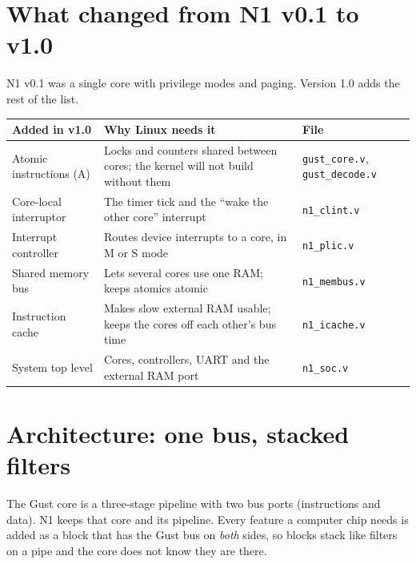 \documentclass[10pt,a4paper]{article}
\newcommand{\code}[1]{\texttt{#1}}
\begin{document}
\section{What changed from N1 v0.1 to v1.0}
N1 v0.1 was a single core with privilege modes and paging. Version 1.0 adds the rest of the list.

\begin{center}\small
\begin{tabularx}{\linewidth}{@{}lXl@{}}
\toprule
Added in v1.0 & Why Linux needs it & File\\
\midrule
Atomic instructions (A) & Locks and counters shared between cores; the kernel will not build without them & \code{gust\_core.v}, \code{gust\_decode.v}\\
Core-local interruptor & The timer tick and the ``wake the other core'' interrupt & \code{n1\_clint.v}\\
Interrupt controller & Routes device interrupts to a core, in M or S mode & \code{n1\_plic.v}\\
Shared memory bus & Lets several cores use one RAM; keeps atomics atomic & \code{n1\_membus.v}\\
Instruction cache & Makes slow external RAM usable; keeps the cores off each other's bus time & \code{n1\_icache.v}\\
System top level & Cores, controllers, UART and the external RAM port & \code{n1\_soc.v}\\
\bottomrule
\end{tabularx}
\end{center}

\section{Architecture: one bus, stacked filters}\label{sec:arch}
The Gust core is a three-stage pipeline with two bus ports (instructions and data). N1 keeps that core and
its pipeline. Every feature a computer chip needs is added as a block that has the Gust bus on \emph{both}
sides, so blocks stack like filters on a pipe and the core does not know they are there.
\end{document}
